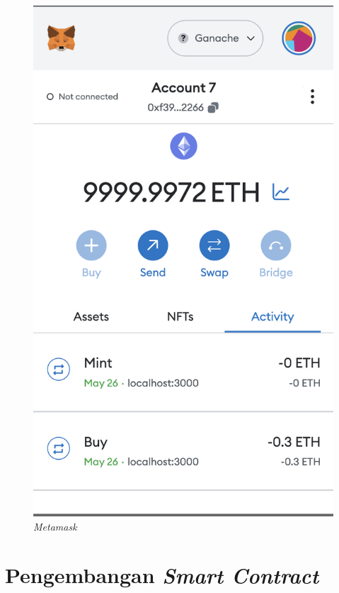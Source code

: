 \begin{figure} [H] 
  \centering
  \includegraphics[scale=0.4]{gambar/img-metamask.png}
  \caption{\emph{Metamask}}
  \label{fig:Metamask}
\end{figure}

\section{Pengembangan \emph{Smart Contract}} 

